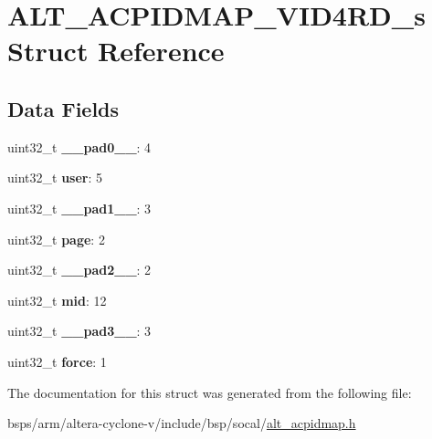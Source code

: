 \hypertarget{structALT__ACPIDMAP__VID4RD__s}{}\section{A\+L\+T\+\_\+\+A\+C\+P\+I\+D\+M\+A\+P\+\_\+\+V\+I\+D4\+R\+D\+\_\+s Struct Reference}
\label{structALT__ACPIDMAP__VID4RD__s}
\subsection*{Data Fields}
\begin{DoxyCompactItemize}
\item 
\mbox{\label{structALT__ACPIDMAP__VID4RD__s_ad1d26c7cd05c00b3a4ebb5c7b14b5ab2}} 
uint32\+\_\+t {\bfseries \+\_\+\+\_\+pad0\+\_\+\+\_\+}\+: 4
\item 
\mbox{\label{structALT__ACPIDMAP__VID4RD__s_abcdc969e1461a51d6bda6adbbdcf122d}} 
uint32\+\_\+t {\bfseries user}\+: 5
\item 
\mbox{\label{structALT__ACPIDMAP__VID4RD__s_ae49f9e724c66bc4a56941e323abc9475}} 
uint32\+\_\+t {\bfseries \+\_\+\+\_\+pad1\+\_\+\+\_\+}\+: 3
\item 
\mbox{\label{structALT__ACPIDMAP__VID4RD__s_a972833d5ee252018e37d09211e068ca4}} 
uint32\+\_\+t {\bfseries page}\+: 2
\item 
\mbox{\label{structALT__ACPIDMAP__VID4RD__s_af730aab67d82547d45a0997c891bbfe1}} 
uint32\+\_\+t {\bfseries \+\_\+\+\_\+pad2\+\_\+\+\_\+}\+: 2
\item 
\mbox{\label{structALT__ACPIDMAP__VID4RD__s_a00d060c8b5afd1038de134652ff2380a}} 
uint32\+\_\+t {\bfseries mid}\+: 12
\item 
\mbox{\label{structALT__ACPIDMAP__VID4RD__s_afa4205d6910cc446850de1dd03b74d5c}} 
uint32\+\_\+t {\bfseries \+\_\+\+\_\+pad3\+\_\+\+\_\+}\+: 3
\item 
\mbox{\label{structALT__ACPIDMAP__VID4RD__s_affb03022d3c2ba97c75bff69007847b4}} 
uint32\+\_\+t {\bfseries force}\+: 1
\end{DoxyCompactItemize}


The documentation for this struct was generated from the following file\+:\begin{DoxyCompactItemize}
\item 
bsps/arm/altera-\/cyclone-\/v/include/bsp/socal/\mbox{\hyperlink{alt__acpidmap_8h}{alt\+\_\+acpidmap.\+h}}\end{DoxyCompactItemize}
